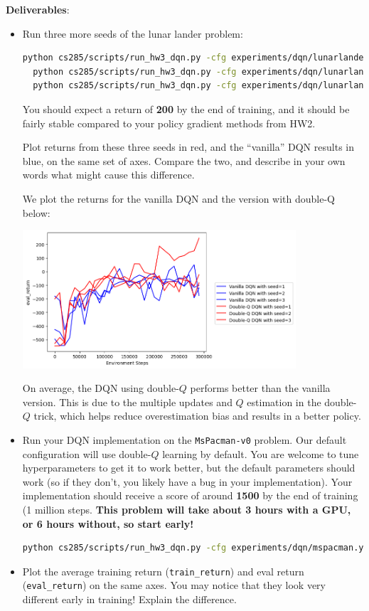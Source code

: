 \textbf{Deliverables}:
\begin{itemize}
    \item Run three more seeds of the lunar lander problem:
\begin{lstlisting}[language=bash,breaklines=true]
  python cs285/scripts/run_hw3_dqn.py -cfg experiments/dqn/lunarlander_doubleq.yaml --seed 1
  python cs285/scripts/run_hw3_dqn.py -cfg experiments/dqn/lunarlander_doubleq.yaml --seed 2
  python cs285/scripts/run_hw3_dqn.py -cfg experiments/dqn/lunarlander_doubleq.yaml --seed 3
\end{lstlisting}
    You should expect a return of \textbf{200} by the end of training, and it should be fairly stable compared to your policy gradient methods from HW2.
    
    Plot returns from these three seeds in red, and the ``vanilla'' DQN results in blue, on the same set of axes. Compare the two, and describe in your own words what might cause this difference.

    \begin{sol}
        We plot the returns for the vanilla DQN and the version with double-Q below:
        \begin{center}
            \includegraphics[width=4in]{../q2.5_lunarlander.png}
        \end{center}
        On average, the DQN using double-$Q$ performs better than the vanilla version. This is due to the multiple updates and $Q$ estimation in the double-$Q$ trick, which helps reduce overestimation bias and results in a better policy.
    \end{sol}

    \item Run your DQN implementation on the \verb|MsPacman-v0| problem. Our default configuration will use double-$Q$ learning by default. You are welcome to tune hyperparameters to get it to work better, but the default parameters should work (so if they don't, you likely have a bug in your implementation). Your implementation should receive a score of around \textbf{1500} by the end of training (1 million steps. \textbf{This problem will take about 3 hours with a GPU, or {\color{red} 6 hours} without, so start early!}
    \begin{lstlisting}[language=bash,breaklines=true]
    python cs285/scripts/run_hw3_dqn.py -cfg experiments/dqn/mspacman.yaml
    \end{lstlisting}
    \item Plot the average training return (\verb|train_return|) and eval return (\verb|eval_return|) on the same axes. You may notice that they look very different early in training! Explain the difference.


\end{itemize}
